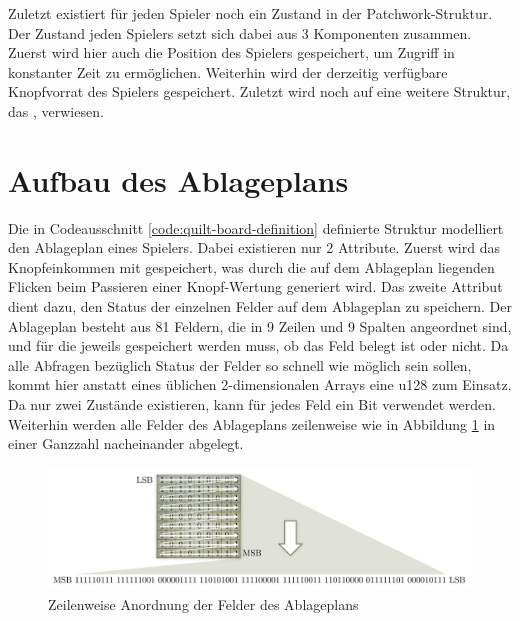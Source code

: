 Zuletzt existiert für jeden Spieler noch ein Zustand in der Patchwork-Struktur. Der Zustand jeden Spielers setzt sich dabei aus 3 Komponenten zusammen. Zuerst wird hier auch die Position des Spielers gespeichert, um Zugriff in konstanter Zeit zu ermöglichen. Weiterhin wird der derzeitig verfügbare Knopfvorrat des Spielers gespeichert. Zuletzt wird noch auf eine weitere Struktur, das , verwiesen.

\section{Aufbau des Ablageplans}


\vspace*{-0.3cm}

Die in Codeausschnitt \ref{code:quilt-board-definition} definierte Struktur  modelliert den Ablageplan eines Spielers. Dabei existieren nur 2 Attribute. Zuerst wird das Knopfeinkommen mit  gespeichert, was durch die auf dem Ablageplan liegenden Flicken beim Passieren einer Knopf-Wertung generiert wird. Das zweite Attribut  dient dazu, den Status der einzelnen Felder auf dem Ablageplan zu speichern. Der Ablageplan besteht aus 81 Feldern, die in 9 Zeilen und 9 Spalten angeordnet sind, und für die jeweils gespeichert werden muss, ob das Feld belegt ist oder nicht. Da alle Abfragen bezüglich Status der Felder so schnell wie möglich sein sollen, kommt hier anstatt eines üblichen 2-dimensionalen Arrays eine \ac{u128} zum Einsatz. Da nur zwei Zustände existieren, kann für jedes Feld ein Bit verwendet werden. Weiterhin werden alle Felder des Ablageplans zeilenweise wie in Abbildung \ref{fig:quilt-board-storage} in einer Ganzzahl nacheinander abgelegt.

\vspace*{-5cm}
\pagebreak

\begin{figure}[!ht]
    \centering
     \vspace*{-\baselineskip}
    \includegraphics[width=\textwidth]{res/pictures/quilt-board-storage.pdf}
    \caption{Zeilenweise Anordnung der Felder des Ablageplans}
    \label{fig:quilt-board-storage}
\end{figure}

